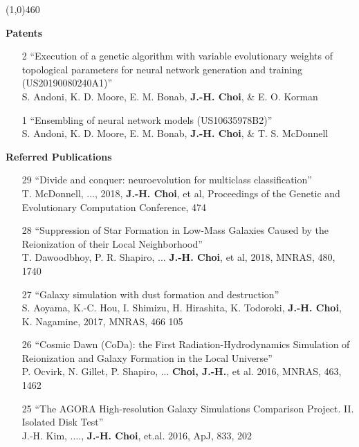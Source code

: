 \documentclass [11pt]{article}
\begin{document}
{{\line(1,0){460}
\vspace{.1in}

\noindent
{\textbf{Patents}}
\begin{enumerate}

\item[2] ``Execution of a genetic algorithm with variable evolutionary weights of topological parameters for neural network generation and training (US20190080240A1)'' \\ S. Andoni, K. D. Moore, E. M. Bonab, \textbf{J.-H. Choi}, \& E. O. Korman

\item[1] ``Ensembling of neural network models (US10635978B2)'' \\ S. Andoni, K. D. Moore, E. M. Bonab, \textbf{J.-H. Choi}, \& T. S. McDonnell
\end{enumerate}

\vspace{.1in}
\noindent
{\textbf{Referred Publications}}
\begin{enumerate}

\item[29] ``Divide and conquer: neuroevolution for multiclass classification'' \\ T. McDonnell, ..., 2018, \textbf{J.-H. Choi}, et al, Proceedings of the Genetic and Evolutionary Computation Conference, 474

\item[28] ``Suppression of Star Formation in Low-Mass Galaxies Caused by the Reionization of their Local Neighborhood''\\ T. Dawoodbhoy, P. R. Shapiro, ... \textbf{J.-H. Choi}, et al, 2018, MNRAS, 480, 1740
  
\item[27] ``Galaxy simulation with dust formation and destruction''\\ S. Aoyama, K.-C. Hou, I. Shimizu, H. Hirashita, K. Todoroki, \textbf{J.-H. Choi}, K. Nagamine, 2017, MNRAS, 466 105
  
\item[26] ``Cosmic Dawn (CoDa): the First Radiation-Hydrodynamics Simulation of Reionization and Galaxy Formation in the Local Universe''\\ P. Ocvirk, N. Gillet, P. Shapiro, ... \textbf{Choi, J.-H.}, et al. 2016, MNRAS, 463, 1462

\item[25] ``The AGORA High-resolution Galaxy Simulations Comparison Project. II. Isolated Disk Test''\\ J.-H. Kim, ...., \textbf{J.-H. Choi}, et.al. 2016, ApJ, 833, 202


\end{enumerate}}}
\end{document}
